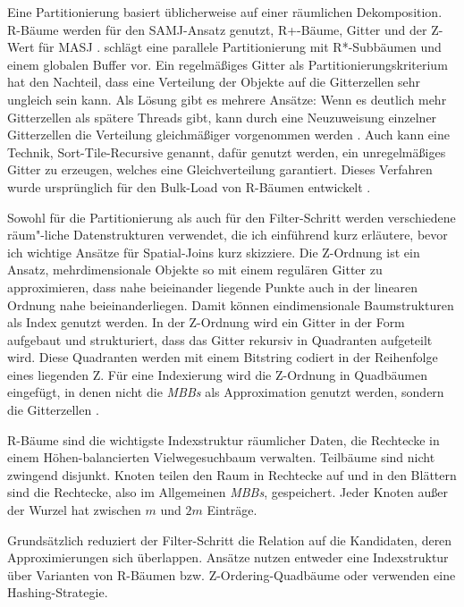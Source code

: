 \documentclass[a4paper,12pt,twoside]{article}
\newcommand{\Fb}[1]{\textit{#1}} %
\begin{document}
Eine Partitionierung basiert üblicherweise auf einer räumlichen Dekomposition. R-Bäume werden für den SAMJ-Ansatz genutzt, R+-Bäume, Gitter und der Z-Wert für MASJ \parencite{Zhou1998}. {\textcite{Brinkhoff1996}} schlägt eine parallele Partitionierung mit R*-Subbäumen und einem globalen Buffer vor. Ein regelmäßiges Gitter als Partitionierungskriterium hat den Nachteil, dass eine Verteilung der Objekte auf die Gitterzellen sehr ungleich sein kann. Als Lösung gibt es mehrere Ansätze: Wenn es deutlich mehr Gitterzellen als spätere Threads gibt, kann durch eine Neuzuweisung einzelner Gitterzellen die Verteilung gleichmäßiger vorgenommen werden \parencite{Patel1996}. Auch kann eine Technik, Sort-Tile-Recursive genannt, dafür genutzt werden, ein unregelmäßiges Gitter zu erzeugen, welches eine Gleichverteilung garantiert. Dieses Verfahren wurde ursprünglich für den Bulk-Load von R-Bäumen entwickelt \parencite{Leutenegger1997}.

Sowohl für die Partitionierung als auch für den Filter-Schritt werden verschiedene räum"-liche Datenstrukturen verwendet, die ich einführend kurz erläutere, bevor ich wichtige Ansätze für Spatial-Joins kurz skizziere. Die Z-Ordnung ist ein Ansatz, mehrdimensionale Objekte so mit einem regulären Gitter zu approximieren, dass nahe beieinander liegende Punkte auch in der linearen Ordnung nahe beieinanderliegen. Damit können eindimensionale Baumstrukturen als Index genutzt werden. In der Z-Ordnung wird ein Gitter in der Form aufgebaut und strukturiert, dass das Gitter rekursiv in Quadranten aufgeteilt wird. Diese Quadranten werden mit einem Bitstring codiert in der Reihenfolge eines liegenden Z. Für eine Indexierung wird die Z-Ordnung in Quadbäumen eingefügt, in denen nicht die \Fb{MBBs} als Approximation genutzt werden, sondern die Gitterzellen \parencite[S. 227ff]{Rigaux2001}.

R-Bäume sind die wichtigste Indexstruktur räumlicher Daten, die Rechtecke in einem Höhen-balancierten Vielwegesuchbaum verwalten. Teilbäume sind nicht zwingend disjunkt. Knoten teilen den Raum in Rechtecke auf und in den Blättern sind die Rechtecke, also im Allgemeinen \Fb{MBBs}, gespeichert. Jeder Knoten außer der Wurzel hat zwischen $m$ und $2 m$ Einträge.

Grundsätzlich reduziert der Filter-Schritt die Relation auf die Kandidaten, deren Approximierungen sich überlappen. Ansätze nutzen entweder eine Indexstruktur über Varianten von R-Bäumen bzw. Z-Ordering-Quadbäume oder verwenden eine Hashing-Strategie.
\end{document}
